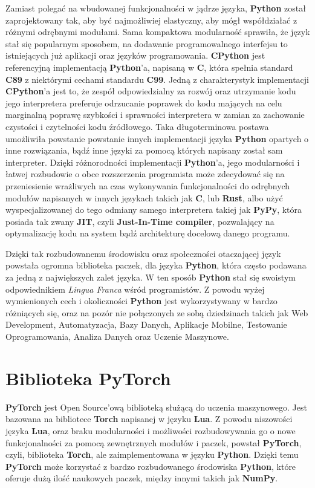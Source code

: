 Zamiast polegać na wbudowanej funkcjonalności w jądrze języka, \textbf{Python} został zaprojektowany tak, aby być najmożliwiej elastyczny, aby mógł współdziałać z różnymi odrębnymi modułami. Sama kompaktowa modularność sprawiła, że język stał się popularnym sposobem, na dodawanie programowalnego interfejsu to istniejących już aplikacji oraz języków programowania.
\textbf{CPython} jest referencyjną implementacją \textbf{Python}'a, napisaną w \textbf{C}, która spełnia standard \textbf{C89} z niektórymi cechami standardu \textbf{C99}. Jedną z charakterystyk implementacji \textbf{CPython}'a jest to, że zespół odpowiedzialny za rozwój oraz utrzymanie kodu jego interpretera preferuje odrzucanie poprawek do kodu mających na celu marginalną poprawę szybkości i sprawności interpretera w zamian za zachowanie czystości i czytelności kodu źródłowego. Taka długoterminowa postawa umożliwiła powstanie powstanie innych implementacji języka \textbf{Python} opartych o inne rozwiązania, bądź inne języki za pomocą których napisany został sam interpreter. Dzięki różnorodności implementacji \textbf{Python}'a, jego modularności i łatwej rozbudowie o obce rozszerzenia programista może zdecydować się na przeniesienie wrażliwych na czas wykonywania funkcjonalności do odrębnych modułów napisanych w innych językach takich jak \textbf{C}, lub \textbf{Rust}, albo użyć wyspecjalizowanej do tego odmiany samego interpretera takiej jak \textbf{PyPy}, która posiada tak zwany \textbf{JIT}, czyli \textbf{Just-In-Time compiler}, pozwalający na optymalizację kodu na system bądź architekturę docelową danego programu.

Dzięki tak rozbudowanemu środowisku oraz społeczności otaczającej język powstała ogromna biblioteka paczek, dla języka \textbf{Python}, która często podawana za jedną z największych zalet języka. W ten sposób \textbf{Python} stał się swoistym odpowiednikiem \textit{Lingua Franca} wśród programistów. Z powodu wyżej wymienionych cech i okoliczności \textbf{Python} jest wykorzystywany w bardzo różniących się, oraz na pozór nie połączonych ze sobą dziedzinach takich jak Web Development, Automatyzacja, Bazy Danych, Aplikacje Mobilne, Testowanie Oprogramowania, Analiza Danych oraz Uczenie Maszynowe.



\section{Biblioteka PyTorch}

\textbf{PyTorch} \cite{PyTorchWebSite} \cite{DeepLearningWithPyTorch} jest Open Source'ową biblioteką służącą do uczenia maszynowego. Jest bazowana na bibliotece \textbf{Torch} napisanej w języku \textbf{Lua}. Z powodu niszowości języka \textbf{Lua}, oraz braku modularności i możliwości rozbudowywania go o nowe funkcjonalności za pomocą zewnętrznych modułów i paczek, powstał \textbf{PyTorch}, czyli, biblioteka \textbf{Torch}, ale zaimplementowana w języku \textbf{Python}. Dzięki temu \textbf{PyTorch} może korzystać z bardzo rozbudowanego środowiska \textbf{Python}, które oferuje dużą ilość naukowych paczek, między innymi takich jak \textbf{NumPy}.


